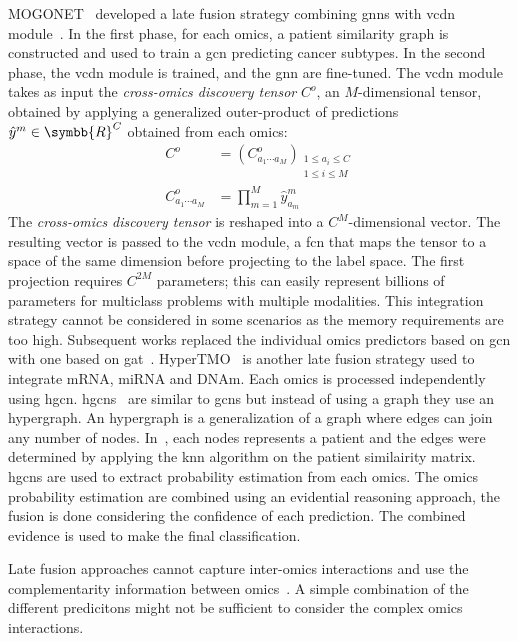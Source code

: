 \documentclass[../main.tex]{subfiles}
\begin{document}
		MOGONET~\cite{MOGONET} developed a late fusion strategy combining \glspl{gnn} with \gls{vcdn} module~\cite{VCDN}.
		In the first phase, for each omics, a patient similarity graph is constructed and used to train a \gls{gcn} predicting cancer subtypes.
		In the second phase, the \gls{vcdn} module is trained, and the \gls{gnn} are fine-tuned.
		The \gls{vcdn} module takes as input the \emph{cross-omics discovery tensor} \(C^{o}\), an \(M\)-dimensional tensor, obtained by applying a generalized outer-product of predictions \(\hat{y}^{m} \in \symbb{R}^{C}\) obtained from each omics:
		\begin{align*}
			C^{o}                     & = {\left(C^{o}_{a_{1}\cdots a_{M}}\right)}_{\substack{1 \leq a_{i} \leq C \\ 1 \leq i \leq M}} \\
			C^{o}_{a_{1}\cdots a_{M}} & = \prod_{m=1}^{M}\hat{y}_{a_{m}}^{m}
		\end{align*}
		The \emph{cross-omics discovery tensor} is reshaped into a \(C^{M}\)-dimensional vector.
		The resulting vector is passed to the \gls{vcdn} module, a \gls{fcn} that maps the tensor to a space of the same dimension before projecting to the label space.
		The first projection requires \(C^{2M}\) parameters; this can easily represent billions of parameters for multiclass problems with multiple modalities.
		This integration strategy cannot be considered in some scenarios as the memory requirements are too high.
		Subsequent works replaced the individual omics predictors based on \gls{gcn} with one based on \gls{gat}~\cite{MODILM,Leng2022}.
		HyperTMO~\cite{Wang2024} is another late fusion strategy used to integrate mRNA, miRNA and DNAm.
		Each omics is processed independently using \gls{hgcn}.
		\Glspl{hgcn}~\cite{Feng2019} are similar to \glspl{gcn} but instead of using a graph they use an hypergraph.
		An hypergraph is a generalization of a graph where edges can join any number of nodes.
		In~\cite{Wang2024}, each nodes represents a patient and the edges were determined by applying the \gls{knn} algorithm on the patient similairity matrix.
		\Glspl{hgcn} are used to extract probability estimation from each omics.
		The omics probability estimation are combined using an evidential reasoning approach, the fusion is done considering the confidence of each prediction.
		The combined evidence is used to make the final classification.

		Late fusion approaches cannot capture inter-omics interactions and use the complementarity information between omics~\cite{Picard2021}.
		A simple combination of the different predicitons might not be sufficient to consider the complex omics interactions.
\end{document}
